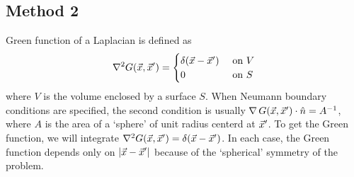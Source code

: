 \subsection{Method 2}\label{c2sa7} 
Green function of a Laplacian is defined as
\[
\nabla^2 G(\vec{x}, \vec{x}^\prime) = \begin{cases}
\delta(\vec{x} - \vec{x}^\prime) & \text{ on } V \\
0 & \text{ on } S
\end{cases}
\]
where $V$ is the volume enclosed by a surface $S$. When Neumann boundary conditions are specified, the second condition is usually $\operatorname{\nabla}{G(\vec{x}, \vec{x}^\prime)}\cdot\hat{n} = A^{-1}$, 
where $A$ is the area of a \enquote*{sphere} of unit radius centerd at $\vec{x}^\prime$. To get the Green function, we will integrate $\nabla^2 G(\vec{x}, \vec{x}^\prime) = 
\delta(\vec{x} - \vec{x}^\prime)$. In each case, the Green function depends only on $|\vec{x} - \vec{x}^\prime|$ because of the \enquote*{spherical} symmetry of the problem.
